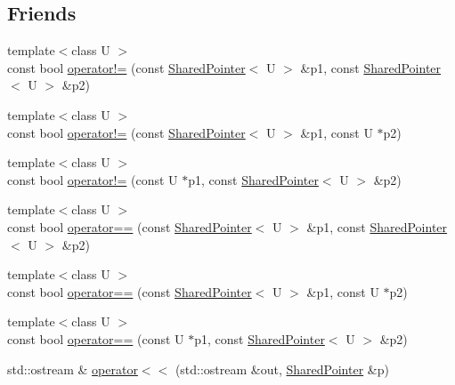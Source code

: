 \subsection*{Friends}
\begin{DoxyCompactItemize}
\item 
{\footnotesize template$<$class U $>$ }\\const bool \hyperlink{classprism_1_1_shared_pointer_a497bc2f2bc9e68da0cd9a80dc5b3b99a}{operator!=} (const \hyperlink{classprism_1_1_shared_pointer}{Shared\+Pointer}$<$ U $>$ \&p1, const \hyperlink{classprism_1_1_shared_pointer}{Shared\+Pointer}$<$ U $>$ \&p2)
\item 
{\footnotesize template$<$class U $>$ }\\const bool \hyperlink{classprism_1_1_shared_pointer_afa1e95ed17f645ed02ee12494d006a7b}{operator!=} (const \hyperlink{classprism_1_1_shared_pointer}{Shared\+Pointer}$<$ U $>$ \&p1, const U $\ast$p2)
\item 
{\footnotesize template$<$class U $>$ }\\const bool \hyperlink{classprism_1_1_shared_pointer_a6e788a3f86ea0f744f7f58ff0d1a6365}{operator!=} (const U $\ast$p1, const \hyperlink{classprism_1_1_shared_pointer}{Shared\+Pointer}$<$ U $>$ \&p2)
\item 
{\footnotesize template$<$class U $>$ }\\const bool \hyperlink{classprism_1_1_shared_pointer_ae1688caf7bd4dc08f775cbe830ecd6cd}{operator==} (const \hyperlink{classprism_1_1_shared_pointer}{Shared\+Pointer}$<$ U $>$ \&p1, const \hyperlink{classprism_1_1_shared_pointer}{Shared\+Pointer}$<$ U $>$ \&p2)
\item 
{\footnotesize template$<$class U $>$ }\\const bool \hyperlink{classprism_1_1_shared_pointer_ac396e2d37f10207b0e4da099d03ef759}{operator==} (const \hyperlink{classprism_1_1_shared_pointer}{Shared\+Pointer}$<$ U $>$ \&p1, const U $\ast$p2)
\item 
{\footnotesize template$<$class U $>$ }\\const bool \hyperlink{classprism_1_1_shared_pointer_a4001c70f47a8e58a039f8f657f8334b5}{operator==} (const U $\ast$p1, const \hyperlink{classprism_1_1_shared_pointer}{Shared\+Pointer}$<$ U $>$ \&p2)
\item 
std\+::ostream \& \hyperlink{classprism_1_1_shared_pointer_a59120dbc6c4aab96755e65df06ba2963}{operator$<$$<$} (std\+::ostream \&out, \hyperlink{classprism_1_1_shared_pointer}{Shared\+Pointer} \&p)
\end{DoxyCompactItemize}


